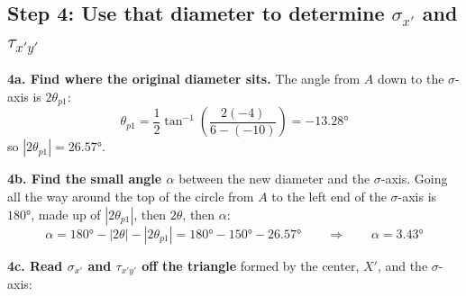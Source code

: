 \documentclass[11pt]{article}
\begin{document}
\subsection*{Step 4: Use that diameter to determine $\sigma_{x'}$ and $\tau_{x'y'}$}

\noindent
\begin{minipage}[c]{0.45\textwidth}
\textbf{4a. Find where the original diameter sits.} The angle from $A$ down to the
$\sigma$-axis is $2\theta_{p1}$:
\[
  \theta_{p1} = \frac12\tan^{-1}\!\left(\frac{2(-4)}{6-(-10)}\right) = -\ang{13.28}
\]
so $|2\theta_{p1}| = \ang{26.57}$.
\end{minipage}%
\hfill
\begin{minipage}[c]{0.52\textwidth}
\centering{}
\end{minipage}

\bigskip
\noindent
\textbf{4b. Find the small angle $\alpha$} between the new diameter and the $\sigma$-axis.
Going all the way around the top of the circle from $A$ to the left end of the
$\sigma$-axis is $\ang{180}$, made up of $|2\theta_{p1}|$, then $2\theta$, then $\alpha$:
\[
  \alpha = \ang{180} - |2\theta| - |2\theta_{p1}| = \ang{180} - \ang{150} - \ang{26.57}
  \qquad\Rightarrow\qquad
  \boxed{\alpha = \ang{3.43}}
\]

\noindent
\textbf{4c. Read $\sigma_{x'}$ and $\tau_{x'y'}$ off the triangle} formed by the center,
$X'$, and the $\sigma$-axis:
\end{document}
